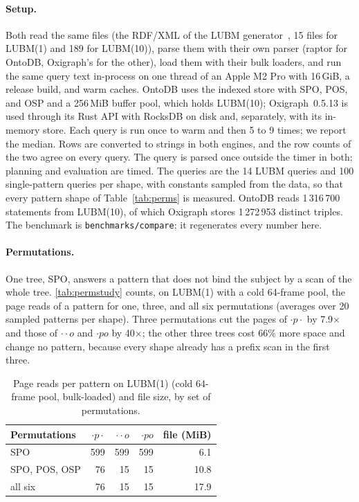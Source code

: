 \documentclass[sigconf, nonacm]{acmart}
\newcommand{\sys}{OntoDB}
\newcommand{\code}[1]{\texttt{#1}}
\begin{document}
\paragraph{Setup.} Both read the same files (the RDF/XML of the LUBM generator~\cite{lubm}, 15 files for LUBM(1) and 189 for LUBM(10)), parse them with their own parser (raptor for \sys{}, Oxigraph's for the other), load them with their bulk loaders, and run the same query text in-process on one thread of an Apple M2 Pro with 16\,GiB, a release build, and warm caches. \sys{} uses the indexed store with SPO, POS, and OSP and a 256\,MiB buffer pool, which holds LUBM(10); Oxigraph~0.5.13 is used through its Rust API with RocksDB on disk and, separately, with its in-memory store. Each query is run once to warm and then 5 to 9 times; we report the median. Rows are converted to strings in both engines, and the row counts of the two agree on every query. The query is parsed once outside the timer in both; planning and evaluation are timed. The queries are the 14 LUBM queries and 100 single-pattern queries per shape, with constants sampled from the data, so that every pattern shape of Table~\ref{tab:perms} is measured. \sys{} reads 1\,316\,700 statements from LUBM(10), of which Oxigraph stores 1\,272\,953 distinct triples. The benchmark is \code{benchmarks/compare}; it regenerates every number here.

\paragraph{Permutations.} One tree, SPO, answers a pattern that does not bind the subject by a scan of the whole tree. \autoref{tab:permstudy} counts, on LUBM(1) with a cold 64-frame pool, the page reads of a pattern for one, three, and all six permutations (averages over 20 sampled patterns per shape). Three permutations cut the pages of $\cdot p\cdot$ by 7.9$\times$ and those of $\cdot\cdot o$ and $\cdot po$ by 40$\times$; the other three trees cost 66\% more space and change no pattern, because every shape already has a prefix scan in the first three.

\begin{table}[t]
\caption{Page reads per pattern on LUBM(1) (cold 64-frame pool, bulk-loaded) and file size, by set of permutations.}
\label{tab:permstudy}
\small
\begin{tabular}{@{}lrrrr@{}}
\toprule
Permutations & $\cdot p\cdot$ & $\cdot\cdot o$ & $\cdot po$ & file (MiB) \\
\midrule
SPO & 599 & 599 & 599 & 6.1 \\
SPO, POS, OSP & 76 & 15 & 15 & 10.8 \\
all six & 76 & 15 & 15 & 17.9 \\
\bottomrule
\end{tabular}
\end{table}
\end{document}
